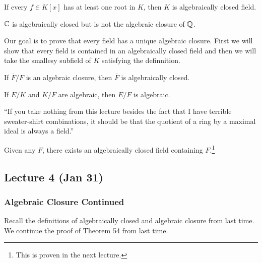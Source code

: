 \documentclass[10pt, twoside]{article}
\begin{document}
    \begin{defn}
        If every $f \in K[x]$ has at least one root in $K$, then $K$ is algebraically closed field.
    \end{defn}

    \begin{exm}
        $\mathbb{C}$ is algebraically closed but is not the algebraic closure of $\mathbb{Q}$.
    \end{exm}

    Our goal is to prove that every field has a unique algebraic closure. First we will show that every field is contained in an algebraically closed field and then we will take the smallesy subfield of $K$ satisfying the definnition.

    \begin{prop}
        If $\overline{F}/F$ is an algebraic closure, then $\overline{F}$ is algebraically closed.
    \end{prop}

    \begin{lem}
        If $E/K$ and $K/F$ are algebraic, then $E/F$ is algebraic.
    \end{lem}

    ``If you take nothing from this lecture besides the fact that I have terrible sweater-shirt combinations, it should be that the quotient of a ring by a maximal ideal is always a field.''
    
    \begin{thm}
        Given any $F$, there exists an algebraically closed field containing $F$.\footnote{This is proven in the next lecture.}
    \end{thm}

    \subsection{Lecture 4 (Jan 31)}
    \subsubsection{Algebraic Closure Continued}

    Recall the definitions of algebraically closed and algebraic closure from last time. We continue the proof of Theorem 54 from last time.
\end{document}
